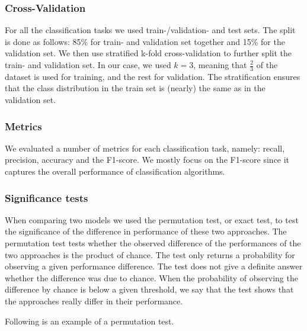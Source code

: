 
\subsubsection{Cross-Validation}
For all the classification tasks we used train-/validation- and test sets.
The split is done as follows: 85\% for train- and validation set together and 15\% for the validation set.
We then use stratified k-fold cross-validation to further split the train- and validation set. In our case, we used $k = 3$, meaning that $\frac{2}{3}$ of the dataset is used for training, and the rest for validation.
The stratification ensures that the class distribution in the train set is (nearly) the same as in the validation set.


\subsubsection{Metrics}
We evaluated a number of metrics for each classification task, namely: 
recall, precision, accuracy and the F1-score. We mostly focus on the F1-score since it captures the overall performance of classification algorithms.

\subsubsection{Significance tests}
When comparing two models we used the permutation test, or exact test, to test the significance of the difference in performance of these two approaches.
The permutation test tests whether the observed difference of the performances of the two approaches is the product of chance.
The test only returns a probability for observing a given performance difference. The test does not give a definite answer whether the difference was due to chance.
When the probability of observing the difference by chance is below a given threshold, we say that the test shows that the approaches really differ in their performance.

Following is an example of a permutation test.

